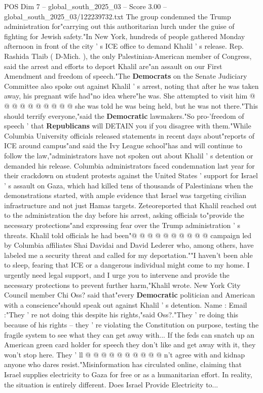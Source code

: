 \begin{textsample}{POS Dim 7 – global\_south\_2025\_03 – Score 3.00 – global\_south\_2025\_03/122239732.txt}
The group condemned the Trump administration for"carrying out this authoritarian lurch under the guise of fighting for Jewish safety."In New York, hundreds of people gathered Monday afternoon in front of the city ' s ICE office to demand Khalil ' s release.
Rep.
Rashida Tlaib ( D-Mich. ), the only Palestinian-American member of Congress, said the arrest and efforts to deport Khalil are"an assault on our First Amendment and freedom of speech."The \textbf{Democrats} on the Senate Judiciary Committee also spoke out against Khalil ' s arrest, noting that after he was taken away, his pregnant wife had"no idea where"he was.
She attempted to visit him @ @ @ @ @ @ @ @ @ @ she was told he was being held, but he was not there."This should terrify everyone,"said the \textbf{Democratic} lawmakers."So pro-'freedom of speech ' that \textbf{Republicans} will DETAIN you if you disagree with them."While Columbia University officials released statements in recent days about"reports of ICE around campus"and said the Ivy League school"has and will continue to follow the law,"administrators have not spoken out about Khalil ' s detention or demanded his release.
Columbia administrators faced condemnation last year for their crackdown on student protests against the United States ' support for Israel ' s assault on Gaza, which had killed tens of thousands of Palestinians when the demonstrations started, with ample evidence that Israel was targeting civilian infrastructure and not just Hamas targets.
Zeteoreported that Khalil reached out to the administration the day before his arrest, asking officials to"provide the necessary protections"and expressing fear over the Trump administration ' s threats.
Khalil told officials he had been"@ @ @ @ @ @ @ @ @ @ campaign led by Columbia affiliates Shai Davidai and David Lederer who, among others, have labeled me a security threat and called for my deportation.""I haven't been able to sleep, fearing that ICE or a dangerous individual might come to my home.
I urgently need legal support, and I urge you to intervene and provide the necessary protections to prevent further harm,"Khalil wrote.
New York City Council member Chi Oss? said that"every \textbf{Democratic} politician and American with a conscience"should speak out against Khalil ' s detention.
Name : Email :"They ' re not doing this despite his rights,"said Oss?."They ' re doing this because of his rights -- they ' re violating the Constitution on purpose, testing the fragile system to see what they can get away with...
If the feds can snatch up an American green card holder for speech they don't like and get away with it, they won't stop here.
They ' ll @ @ @ @ @ @ @ @ @ @ n't agree with and kidnap anyone who dares resist."Misinformation has circulated online, claiming that Israel supplies electricity to Gaza for free or as a humanitarian effort.
In reality, the situation is entirely different.
Does Israel Provide Electricity to...

\end{textsample}
